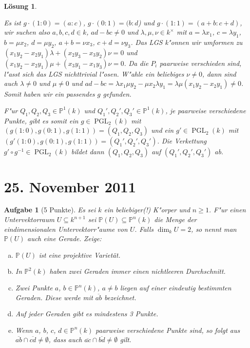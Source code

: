 \documentclass[a4paper, 12pt, numbers=noendperiod, chapterprefix=true, headsepline]{scrbook}
\theoremstyle{break}
\newtheorem{Aufg}{Aufgabe}
\newtheorem{Loes}{L\"osung}
\theoremstyle{nonumberbreak}
\theoremstyle{nonumberplain}
\DeclareMathOperator{\PGL}{PGL} %
\newcommand{\IP}{\mathbb{P}}%
\begin{document}
\begin{Loes}
\begin{enumerate}[a)]
	Es ist $g \cdot (1:0)  = (a:c)$, $g\cdot (0:1) = (b:d$) und $g \cdot (1:1) = (a+b:c+d)$, wir suchen also $a,b,c,d \in k$, $ad-bc \neq 0$ und $\lambda, \mu, \nu \in k^\times$ mit $a = \lambda x_1$, $c = \lambda y_1$, $b = \mu x_2$, $d = \mu y_2$, $a+b = \nu x_3$, $c+d = \nu y_3$. Das LGS k"onnen wir umformen zu $(x_1y_2-x_2y_1) \lambda + (x_2y_3-x_3y_2) \nu = 0$ und $(x_1y_2-x_2y_1) \mu + (x_3y_1-x_1y_3) \nu = 0$. Da die $P_i$ paarweise verschieden sind, l"asst sich das LGS nichttrivial l"osen. W"ahle ein beliebiges $\nu \neq 0$, dann sind auch $\lambda \neq 0$ und $\mu \neq 0$ und $ad-bc = \lambda x_1\mu y_2-\mu x_2\lambda y_1 = \lambda \mu(x_1y_2-x_2y_1) \neq 0$. Somit haben wir ein passendes $g$ gefunden.
	
	F"ur $Q_1, Q_2, Q_3 \in \IP^1(k)$ und $Q_1', Q_2', Q_3' \in \IP^1(k)$, je paarweise verschiedene Punkte, gibt es somit ein $g \in \PGL_2(k)$ mit $(g(1:0), g(0:1), g(1:1)) = (Q_1, Q_2, Q_3)$ und ein $g' \in \PGL_2(k)$ mit $(g'(1:0), g(0:1), g(1:1)) = (Q_1', Q_2', Q_3')$. Die Verkettung $g' \circ g^{-1} \in \PGL_2(k)$ bildet dann $(Q_1, Q_2, Q_3)$ auf $(Q_1', Q_2', Q_3')$ ab.
\end{enumerate}\end{Loes}

\newpage
\section{25. November 2011}
\setcounter{Aufg}{0}
\setcounter{Loes}{0}

\begin{Aufg}[5 Punkte]
Es sei $k$ ein beliebiger(!) K"orper und $n\geq 1$. F"ur einen Untervektorraum $U\subseteq k^{n+1}$ sei $\IP(U)\subseteq \IP^n(k)$ die Menge der eindimensionalen Untervektorr"aume von $U$. Falls $\dim_k U = 2$, so nennt man $\IP(U)$ auch eine \emph{Gerade}. Zeige:
\begin{enumerate}[a)]
	\item $\IP(U)$ ist eine projektive Variet\"at.
	\item In $\IP^2(k)$ haben zwei Geraden immer einen nichtleeren Durchschnitt.
	\item Zwei Punkte $a$, $b\in \IP^n(k)$, $a\neq b$ liegen auf einer eindeutig bestimmten Geraden. Diese werde mit $\overline{ab}$ bezeichnet.
	\item Auf jeder Geraden gibt es mindestens 3 Punkte.
	\item Wenn $a$, $b$, $c$, $d\in \IP^n(k)$ paarweise verschiedene Punkte sind, so folgt aus $\overline{ab}\cap \overline{cd} \neq \emptyset$, dass auch $\overline{ac}\cap \overline{bd} \neq \emptyset$ gilt.
\end{enumerate}
\end{Aufg}
\end{document}
